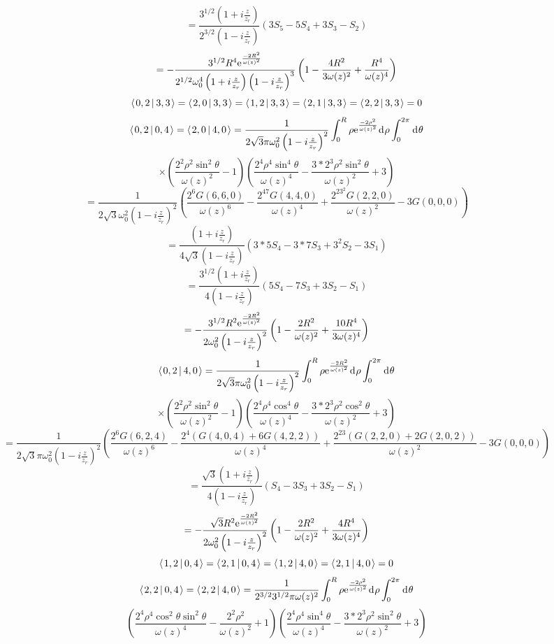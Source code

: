 \documentclass[11pt]{amsart}
\makeatletter
\newcommand{\e}{{\rm e}}				%
\newcommand{\msp}[1]{\mspace{#1mu}}		%
\newcommand{\0}{\varnothing}		%
\newcommand{\dd}{\msp{1} {\rm{d}} \msp{1}}	%
\newcommand{\brac}[2]{\left\langle\msp{2} #1\left\lvert \msp{3.5} #2 \right.\right\rangle}	%
\newcommand{\1}{!}
\newcommand{\2}{@}
\newcommand{\3}{\#}
\newcommand{\4}{\$}
\newcommand{\5}{\%}
\newcommand{\6}{$^\wedge$}
\newcommand{\7}{\&}
\newcommand{\8}{*}
\newcommand{\9}{(}
\makeatother
\begin{document}
\[
=\frac{3^{1/2}\left(1+i\frac{z}{z_r}\right)}{2^{3/2}\left(1-i\frac{z}{z_r}\right)}\left(3S_5-5S_4+3S_3-S_2\right)
\]
\[
=-\frac{3^{1/2}R^4\e^{\frac{-2R^2}{\omega(z)^2}}}{2^{1/2}\omega_0^4\left(1+i\frac{z}{z_r}\right)\left(1-i\frac{z}{z_r}\right)^3}\left(1-\frac{4R^2}{3\omega(z)^2}+\frac{R^4}{\omega(z)^4}\right)
\]
\[
\brac{0,2}{3,3} = \brac{2,0}{3,3} = \brac{1,2}{3,3} =\brac{2,1}{3,3} = \brac{2,2}{3,3} = 0
\]
\[
\brac{0,2}{0,4} = \brac{2,0}{4,0} = \frac{1}{2\sqrt{3}\pi\omega_0^2\left(1-i\frac{z}{z_r}\right)^2}\int_0^R\rho\e^{\frac{-2\rho^2}{\omega(z)^2}}\dd \rho \int_0^{2\pi}\dd \theta
\]
\[
\times\left(\frac{2^2\rho^2\sin^2\theta}{\omega(z)^2}-1\right)\left(\frac{2^4\rho^4\sin^4\theta}{\omega(z)^4}-\frac{3*2^3\rho^2\sin^2\theta}{\omega(z)^2}+3\right)
\]
\[
=\frac{1}{2\sqrt{3}\omega_0^2\left(1-i\frac{z}{z_r}\right)^2}\left(\frac{2^6G(6,6,0)}{\omega(z)^6}-\frac{2^47G(4,4,0)}{\omega(z)^4}+\frac{2^23^2G(2,2,0)}{\omega(z)^2}-3G(0,0,0)\right)
\]
\[
=\frac{\left(1+i\frac{z}{z_r}\right)}{4\sqrt{3}\left(1-i\frac{z}{z_r}\right)}\left(3*5S_4-3*7S_3+3^2S_2-3S_1\right)
\]
\[
=\frac{3^{1/2}\left(1+i\frac{z}{z_r}\right)}{4\left(1-i\frac{z}{z_r}\right)}\left(5S_4-7S_3+3S_2-S_1\right)
\]
\[
=-\frac{3^{1/2}R^2\e^{\frac{-2R^2}{\omega(z)^2}}}{2\omega_0^2\left(1-i\frac{z}{z_r}\right)^2}\left(1-\frac{2R^2}{\omega(z)^2}+\frac{10R^4}{3\omega(z)^4}\right)
\]
\[
\brac{0,2}{4,0} = \frac{1}{2\sqrt{3}\pi \omega_0^2\left(1-i\frac{z}{z_r}\right)^2}\int_0^R \rho \e^{\frac{-2R^2}{\omega(z)^2}}\dd \rho \int_0^{2\pi}\dd \theta
\]
\[
\times\left(\frac{2^2\rho^2\sin^2\theta}{\omega(z)^2}-1\right)\left(\frac{2^4\rho^4\cos^4\theta}{\omega(z)^4}-\frac{3*2^3\rho^2\cos^2\theta}{\omega(z)^2}+3\right)
\]
\[
=\frac{1}{2\sqrt{3}\pi\omega_0^2\left(1-i\frac{z}{z_r}\right)^2}\left(\frac{2^6G(6,2,4)}{\omega(z)^6}-\frac{2^4\left(G(4,0,4)+6G(4,2,2)\right)}{\omega(z)^4}+\frac{2^23\left(G(2,2,0)+2G(2,0,2)\right)}{\omega(z)^2}-3G(0,0,0)\right)
\]
\[
=\frac{\sqrt{3}\left(1+i\frac{z}{z_r}\right)}{4\left(1-i\frac{z}{z_r}\right)}\left(S_4-3S_3+3S_2-S_1\right)
\]
\[
=-\frac{\sqrt{3}R^2\e^{\frac{-2R^2}{\omega(z)^2}}}{2\omega_0^2\left(1-i\frac{z}{z_r}\right)^2}\left(1-\frac{2R^2}{\omega(z)^2}+\frac{4R^4}{3\omega(z)^4}\right)
\]
\[
\brac{1,2}{0,4} = \brac{2,1}{0,4} = \brac{1,2}{4,0} = \brac{2,1}{4,0} = 0
\]
\[
\brac{2,2}{0,4} = \brac{2,2}{4,0} = \frac{1}{2^{3/2}3^{1/2}\pi\omega(z)^2}\int_0^R\rho \e^{\frac{-2\rho^2}{\omega(z)^2}}\dd \rho \int_0^{2\pi}\dd \theta
\]
\[
\left(\frac{2^4\rho^4\cos^2\theta\sin^2\theta}{\omega(z)^4}-\frac{2^2\rho^2}{\omega(z)^2}+1\right)\left(\frac{2^4\rho^4\sin^4\theta}{\omega(z)^4}-\frac{3*2^3\rho^2\sin^2\theta}{\omega(z)^2}+3\right)
\]
\end{document}
